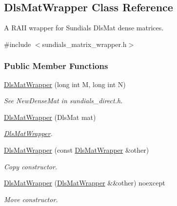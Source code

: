 \hypertarget{classamici_1_1_dls_mat_wrapper}{}\subsection{Dls\+Mat\+Wrapper Class Reference}
\label{classamici_1_1_dls_mat_wrapper}


A R\+A\+II wrapper for Sundials Dls\+Mat dense matrices.  




{\ttfamily \#include $<$sundials\+\_\+matrix\+\_\+wrapper.\+h$>$}

\subsubsection*{Public Member Functions}
\begin{DoxyCompactItemize}
\item 
\mbox{\hyperlink{classamici_1_1_dls_mat_wrapper_aa349fca7529d8cee5def97c93cc057b9}{Dls\+Mat\+Wrapper}} (long int M, long int N)
\begin{DoxyCompactList}\small\item\em See New\+Dense\+Mat in sundials\+\_\+direct.\+h. \end{DoxyCompactList}\item 
\mbox{\hyperlink{classamici_1_1_dls_mat_wrapper_ad3985d43ebee5728e703e4fbd2ce399b}{Dls\+Mat\+Wrapper}} (Dls\+Mat mat)
\begin{DoxyCompactList}\small\item\em \mbox{\hyperlink{classamici_1_1_dls_mat_wrapper}{Dls\+Mat\+Wrapper}}. \end{DoxyCompactList}\item 
\mbox{\hyperlink{classamici_1_1_dls_mat_wrapper_a101a5f6a7eed6a77db1669adc3275f94}{Dls\+Mat\+Wrapper}} (const \mbox{\hyperlink{classamici_1_1_dls_mat_wrapper}{Dls\+Mat\+Wrapper}} \&other)
\begin{DoxyCompactList}\small\item\em Copy constructor. \end{DoxyCompactList}\item 
\mbox{\hyperlink{classamici_1_1_dls_mat_wrapper_a2dc462ec3b73f15fabb1c010976b9377}{Dls\+Mat\+Wrapper}} (\mbox{\hyperlink{classamici_1_1_dls_mat_wrapper}{Dls\+Mat\+Wrapper}} \&\&other) noexcept
\begin{DoxyCompactList}\small\item\em Move constructor. \end{DoxyCompactList}\item 

\end{DoxyCompactItemize}
